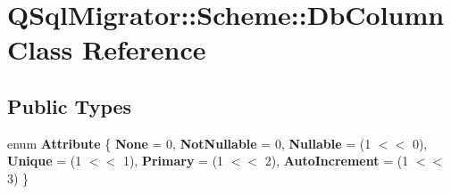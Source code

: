 \hypertarget{class_q_sql_migrator_1_1_scheme_1_1_db_column}{}\section{Q\+Sql\+Migrator\+:\+:Scheme\+:\+:Db\+Column Class Reference}
\label{class_q_sql_migrator_1_1_scheme_1_1_db_column}
\subsection*{Public Types}
\begin{DoxyCompactItemize}
\item 
\mbox{\label{class_q_sql_migrator_1_1_scheme_1_1_db_column_ae8c384698c0482bbdc5ff6afb9f97ec1}} 
enum {\bfseries Attribute} \{ \newline
{\bfseries None} = 0, 
{\bfseries Not\+Nullable} = 0, 
{\bfseries Nullable} = (1 $<$$<$ 0), 
{\bfseries Unique} = (1 $<$$<$ 1), 
\newline
{\bfseries Primary} = (1 $<$$<$ 2), 
{\bfseries Auto\+Increment} = (1 $<$$<$ 3)
 \}
\end{DoxyCompactItemize}
